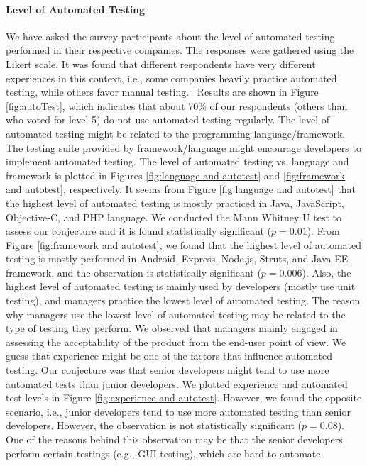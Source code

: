 \paragraph{Level of Automated Testing}
We have asked the survey participants about the level of automated testing performed in their respective companies. The responses were gathered using the Likert scale. It was found that different respondents have very different experiences in this context, i.e., some companies heavily practice automated testing, while others favor manual testing.  Results are shown in Figure \ref{fig:autoTest}, which indicates that about 70\% of our respondents (others than who voted for level 5) do not use automated testing regularly. The level of automated testing might be related to the programming language/framework. The testing suite provided by framework/language might encourage developers to implement automated testing. The level of automated testing vs. language and framework is plotted in Figures \ref{fig:language and autotest} and \ref{fig:framework and autotest}, respectively. It seems from Figure \ref{fig:language and autotest} that the highest level of automated testing is mostly practiced in Java, JavaScript, Objective-C, and PHP language. We conducted the Mann Whitney U test to assess our conjecture and it is found statistically significant ($p=0.01$). From Figure \ref{fig:framework and autotest}, we found that the highest level of automated testing is mostly performed in Android, Express, Node.js, Struts, and Java EE framework, and the observation is statistically significant ($p=0.006$). Also, the highest level of automated testing is mainly used by developers (mostly use unit testing), and managers practice the lowest level of automated testing. The reason why managers use the lowest level of automated testing may be related to the type of testing they perform. We observed that managers mainly engaged in assessing the acceptability of the product from the end-user point of view.  We guess that experience might be one of the factors that influence automated testing. Our conjecture was that senior developers might tend to use more automated tests than junior developers. We plotted experience and automated test levels in Figure \ref{fig:experience and autotest}. However, we found the opposite scenario, i.e., junior developers tend to use more automated testing than senior developers. However, the observation is not statistically significant ($p=0.08$). One of the reasons behind this observation may be that the senior developers perform certain testings (e.g., GUI testing), which are hard to automate.

